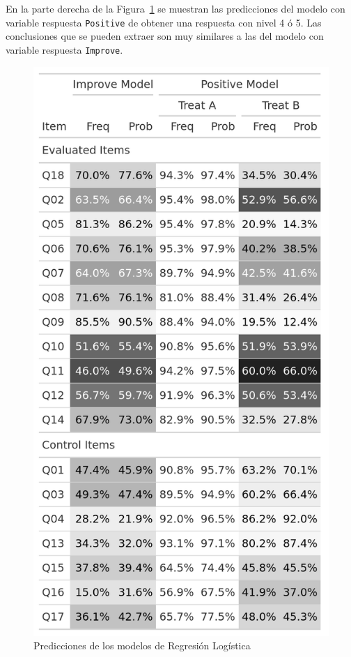 \documentclass[
  12pt,
  a4paper,
  extrafontsizes,
  onecolumn,
  openright,
  table]{memoir}
\begin{document}
En la parte derecha de la Figura~\ref{fig-or} se muestran las
predicciones del modelo con variable respuesta \texttt{Positive} de
obtener una respuesta con nivel 4 ó 5. Las conclusiones que se pueden
extraer son muy similares a las del modelo con variable respuesta
\texttt{Improve}.

\begin{figure}[h]

{\centering \includegraphics[width=\textwidth,height=0.7\textheight]{images/improve.png}

}

\caption{\label{fig-or}Predicciones de los modelos de Regresión
Logística}

\end{figure}
\end{document}
